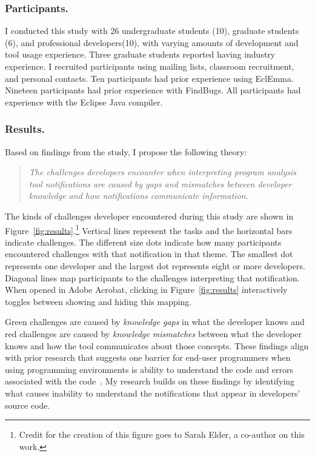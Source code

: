 \documentclass{llncs}
\begin{document}
\subsubsection{Participants.} I conducted this study with 26 undergraduate students (10), graduate students (6), and professional developers(10), with varying amounts of development and tool usage experience. Three graduate students reported having industry experience. I recruited participants using mailing lists, classroom recruitment, and personal contacts.
Ten participants had prior experience using EclEmma. Nineteen participants had prior experience with FindBugs. All participants had experience with the Eclipse Java compiler.

\subsubsection{Results.} 
Based on findings from the study, I propose the following theory:

\begin{quotation}
	\noindent
	\emph{The challenges developers encounter when interpreting program analysis tool notifications are caused by gaps and mismatches between developer knowledge and how notifications communicate information.}
\end{quotation}

The kinds of challenges developer encountered during this study are shown in  Figure~\ref{fig:results}.\footnote{Credit for the creation of this figure goes to Sarah Elder, a co-author on this work.}
Vertical lines represent the tasks and the horizontal bars indicate challenges.
The different size dots indicate how many participants encountered challenges with that notification in that theme. 
The smallest dot represents one developer and the largest dot represents eight or more developers.
Diagonal lines map participants to the challenges interpreting that notification.
\setlength\fboxsep{1pt}
When opened in Adobe Acrobat, clicking  in Figure~\ref{fig:results} interactively toggles between showing and hiding this mapping. 

Green challenges are caused by \emph{knowledge gaps} in what the developer knows and red challenges are caused by \emph{knowledge mismatches} between what the developer knows and how the tool communicates about those concepts.
These findings align with prior research that suggests one barrier for end-user programmers when using programming environments is ability to understand the code and errors associated with the code~\cite{ko2004six}. My research builds on these findings by identifying what causes inability to understand the notifications that appear in developers' source code.  
\end{document}
